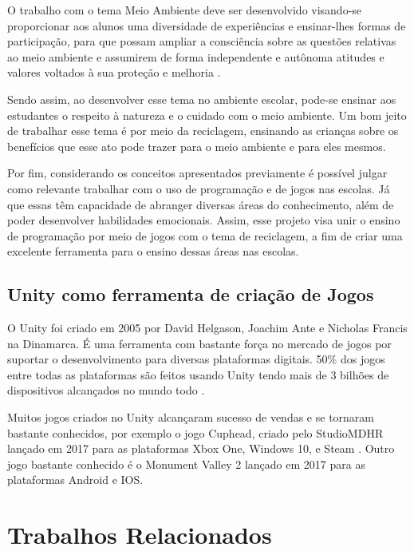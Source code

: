 \begin{citacao}

O trabalho com o tema Meio Ambiente deve ser desenvolvido visando-se proporcionar aos alunos uma diversidade de experiências e ensinar-lhes formas de participação, para que possam ampliar a consciência sobre as questões relativas ao meio ambiente e assumirem de forma independente e autônoma atitudes e valores voltados à sua proteção e melhoria \cite[p. 46]{pcns_2001}.

\end{citacao}


Sendo assim, ao desenvolver esse tema no ambiente escolar, pode-se ensinar aos estudantes o respeito à natureza e o cuidado com o meio ambiente. Um bom jeito de trabalhar esse tema é por meio da reciclagem, ensinando as crianças sobre os benefícios que esse ato pode trazer para o meio ambiente e para eles mesmos.

Por fim, considerando os conceitos apresentados previamente é possível julgar como relevante trabalhar com o uso de programação e de jogos nas escolas. Já que essas têm capacidade de abranger diversas áreas do conhecimento, além de poder desenvolver habilidades emocionais. Assim, esse projeto visa unir o ensino de programação por meio de jogos com o tema de reciclagem, a fim de criar uma excelente ferramenta para o ensino dessas áreas nas escolas.

\subsection{Unity como ferramenta de criação de Jogos}

O Unity foi criado em 2005 por David Helgason, Joachim Ante e Nicholas
Francis na Dinamarca. É uma ferramenta com bastante força no mercado de jogos por suportar o desenvolvimento para diversas plataformas digitais. 50\% dos jogos entre todas as plataformas são feitos usando Unity tendo mais de 3 bilhões de dispositivos alcançados no mundo todo \cite{dados_unity}.

Muitos jogos criados no Unity alcançaram sucesso de vendas e se tornaram bastante conhecidos, por exemplo o jogo Cuphead, criado pelo StudioMDHR lançado em 2017 para as plataformas Xbox One, Windows 10, e Steam \cite{cuphead}. Outro jogo bastante conhecido é o Monument Valley 2 lançado em 2017 para as plataformas Android e IOS\cite{monument_valley_2}.


\section{Trabalhos Relacionados}

